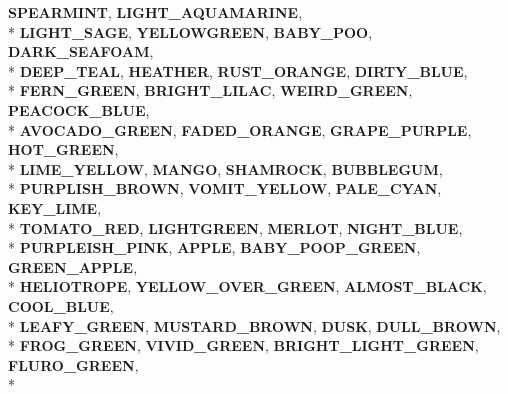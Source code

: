 \begin{DoxyCompactItemize}
{\bfseries S\+P\+E\+A\+R\+M\+I\+NT}, 
{\bfseries L\+I\+G\+H\+T\+\_\+\+A\+Q\+U\+A\+M\+A\+R\+I\+NE}, 
\\*
{\bfseries L\+I\+G\+H\+T\+\_\+\+S\+A\+GE}, 
{\bfseries Y\+E\+L\+L\+O\+W\+G\+R\+E\+EN}, 
{\bfseries B\+A\+B\+Y\+\_\+\+P\+OO}, 
{\bfseries D\+A\+R\+K\+\_\+\+S\+E\+A\+F\+O\+AM}, 
\\*
{\bfseries D\+E\+E\+P\+\_\+\+T\+E\+AL}, 
{\bfseries H\+E\+A\+T\+H\+ER}, 
{\bfseries R\+U\+S\+T\+\_\+\+O\+R\+A\+N\+GE}, 
{\bfseries D\+I\+R\+T\+Y\+\_\+\+B\+L\+UE}, 
\\*
{\bfseries F\+E\+R\+N\+\_\+\+G\+R\+E\+EN}, 
{\bfseries B\+R\+I\+G\+H\+T\+\_\+\+L\+I\+L\+AC}, 
{\bfseries W\+E\+I\+R\+D\+\_\+\+G\+R\+E\+EN}, 
{\bfseries P\+E\+A\+C\+O\+C\+K\+\_\+\+B\+L\+UE}, 
\\*
{\bfseries A\+V\+O\+C\+A\+D\+O\+\_\+\+G\+R\+E\+EN}, 
{\bfseries F\+A\+D\+E\+D\+\_\+\+O\+R\+A\+N\+GE}, 
{\bfseries G\+R\+A\+P\+E\+\_\+\+P\+U\+R\+P\+LE}, 
{\bfseries H\+O\+T\+\_\+\+G\+R\+E\+EN}, 
\\*
{\bfseries L\+I\+M\+E\+\_\+\+Y\+E\+L\+L\+OW}, 
{\bfseries M\+A\+N\+GO}, 
{\bfseries S\+H\+A\+M\+R\+O\+CK}, 
{\bfseries B\+U\+B\+B\+L\+E\+G\+UM}, 
\\*
{\bfseries P\+U\+R\+P\+L\+I\+S\+H\+\_\+\+B\+R\+O\+WN}, 
{\bfseries V\+O\+M\+I\+T\+\_\+\+Y\+E\+L\+L\+OW}, 
{\bfseries P\+A\+L\+E\+\_\+\+C\+Y\+AN}, 
{\bfseries K\+E\+Y\+\_\+\+L\+I\+ME}, 
\\*
{\bfseries T\+O\+M\+A\+T\+O\+\_\+\+R\+ED}, 
{\bfseries L\+I\+G\+H\+T\+G\+R\+E\+EN}, 
{\bfseries M\+E\+R\+L\+OT}, 
{\bfseries N\+I\+G\+H\+T\+\_\+\+B\+L\+UE}, 
\\*
{\bfseries P\+U\+R\+P\+L\+E\+I\+S\+H\+\_\+\+P\+I\+NK}, 
{\bfseries A\+P\+P\+LE}, 
{\bfseries B\+A\+B\+Y\+\_\+\+P\+O\+O\+P\+\_\+\+G\+R\+E\+EN}, 
{\bfseries G\+R\+E\+E\+N\+\_\+\+A\+P\+P\+LE}, 
\\*
{\bfseries H\+E\+L\+I\+O\+T\+R\+O\+PE}, 
{\bfseries Y\+E\+L\+L\+O\+W\+\_\+\+O\+V\+E\+R\+\_\+\+G\+R\+E\+EN}, 
{\bfseries A\+L\+M\+O\+S\+T\+\_\+\+B\+L\+A\+CK}, 
{\bfseries C\+O\+O\+L\+\_\+\+B\+L\+UE}, 
\\*
{\bfseries L\+E\+A\+F\+Y\+\_\+\+G\+R\+E\+EN}, 
{\bfseries M\+U\+S\+T\+A\+R\+D\+\_\+\+B\+R\+O\+WN}, 
{\bfseries D\+U\+SK}, 
{\bfseries D\+U\+L\+L\+\_\+\+B\+R\+O\+WN}, 
\\*
{\bfseries F\+R\+O\+G\+\_\+\+G\+R\+E\+EN}, 
{\bfseries V\+I\+V\+I\+D\+\_\+\+G\+R\+E\+EN}, 
{\bfseries B\+R\+I\+G\+H\+T\+\_\+\+L\+I\+G\+H\+T\+\_\+\+G\+R\+E\+EN}, 
{\bfseries F\+L\+U\+R\+O\+\_\+\+G\+R\+E\+EN}, 
\\*

\end{DoxyCompactItemize}
